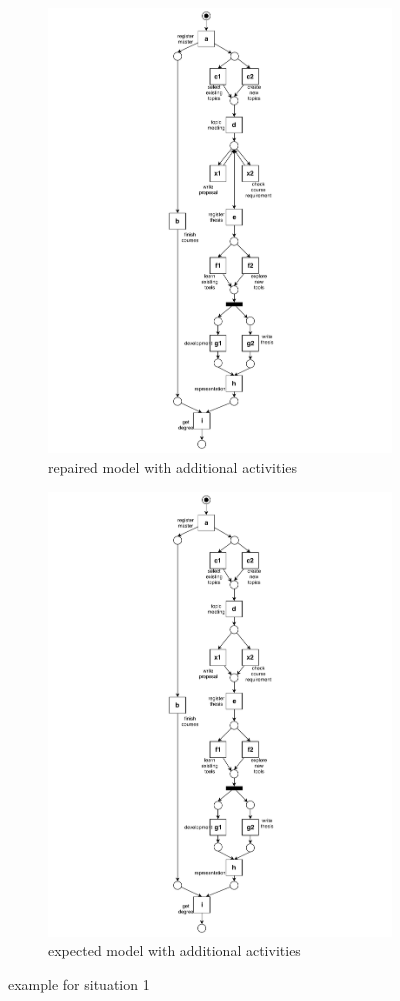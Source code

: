 \begin{figure}[htp]
	\centering
	\begin{subfigure}[b]{0.5\textwidth}
		\centering
		\includegraphics[clip, trim=7cm 0cm 7cm 0cm, width=0.5\linewidth, height=0.7\textheight]{figures/introduction/Master-add-events-loop.pdf}
		\caption{repaired model with additional activities }
		\label{fig:model_b1}
	\end{subfigure}%
	\begin{subfigure}[b]{0.5\textwidth}
		\centering
		\includegraphics[clip, trim=7cm 0cm 7cm 0cm, width=0.5\linewidth, height=0.7\textheight]{figures/introduction/Master-add-events.pdf}
		\caption{expected model with additional activities}
		\label{fig:model_b2}
	\end{subfigure}
	\caption{example for situation 1}
	\label{fig:model_change_1}
\end{figure}
